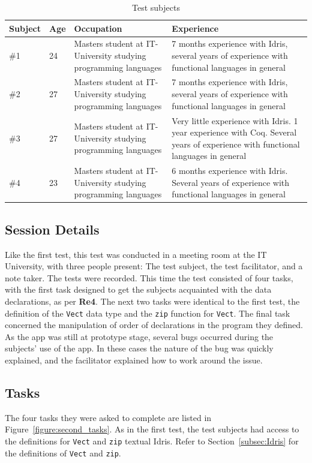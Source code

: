 \begin{table}[ht]
\centering
\begin{tabular}{| l | l | p{5cm} | p{5cm} |}
\hline
Subject & Age & Occupation & Experience \\ \hline
\#1 & 24 & Masters student at IT-University studying programming languages & 7 months experience with Idris, several years of experience with functional languages in general \\ \hline
\#2 & 27 & Masters student at IT-University studying programming languages & 7 months experience with Idris, several years of experience with functional languages in general \\ \hline
\#3 & 27 & Masters student at IT-University studying programming languages & Very little experience with Idris. 1 year experience with Coq. Several years of experience with functional languages in general \\ \hline
\#4 & 23 & Masters student at IT-University studying programming languages & 6 months experience with Idris. Several years of experience with functional languages in general \\ \hline
\end{tabular}
\caption{Test subjects}
\label{table:second_test_subjects}
\end{table}

\subsection{Session Details}
Like the first test, this test was conducted in a meeting room at the IT
University, with three people present: The test subject, the test facilitator,
and a note taker. The tests were recorded. This time the test consisted of four
tasks, with the first task designed to get the subjects acquainted with the
data declarations, as per \textbf{Re4}. The next two tasks were identical to the first test, the
definition of the \texttt{Vect} data type and the \texttt{zip} function for
\texttt{Vect}. The final task concerned the manipulation of order of
declarations in the program they defined. As the app was still at prototype
stage, several bugs occurred during the subjects' use of the app. In these
cases the nature of the bug was quickly explained, and the facilitator
explained how to work around the issue.

\subsection{Tasks}
The four tasks they were asked to complete are listed in 
Figure~\ref{figure:second_tasks}.
As in the first test, the test subjects had access to the definitions for
\texttt{Vect} and \texttt{zip} textual Idris. Refer to Section~\ref{subsec:Idris}
for the definitions of \texttt{Vect} and \texttt{zip}.


